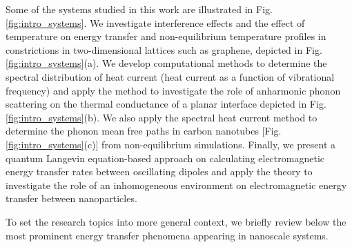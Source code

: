 Some of the systems studied in this work are illustrated in Fig. \ref{fig:intro_systems}. We investigate interference effects and the effect of temperature on energy transfer and non-equilibrium temperature profiles in constrictions in two-dimensional lattices such as graphene, depicted in Fig. \ref{fig:intro_systems}(a). We develop computational methods to determine the spectral distribution of heat current (heat current as a function of vibrational frequency) and apply the method to investigate the role of anharmonic phonon scattering on the thermal conductance of a planar interface depicted in Fig. \ref{fig:intro_systems}(b). We also apply the spectral heat current method to determine the phonon mean free paths in carbon nanotubes [Fig. \ref{fig:intro_systems}(c)] from non-equilibrium simulations. Finally, we present a quantum Langevin equation-based approach on calculating electromagnetic energy transfer rates between oscillating dipoles and apply the theory to investigate the role of an inhomogeneous environment on electromagnetic energy transfer between nanoparticles.




To set the research topics into more general context, we briefly review below the most prominent energy transfer phenomena appearing in nanoscale systems.


